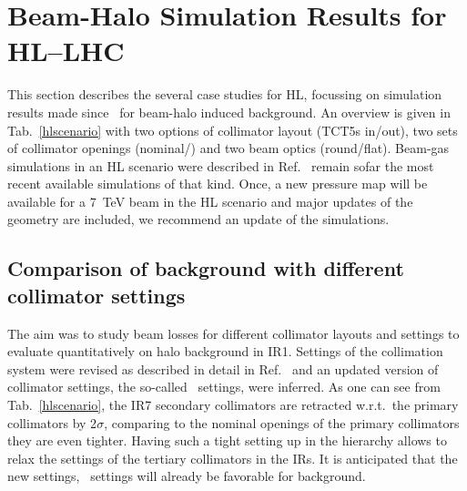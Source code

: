\section{Beam-Halo Simulation Results for HL--LHC\label{hllhcResults}}


This section describes the several case studies for HL, focussing on simulation results made since~\cite{ipac2014_rkh} for beam-halo induced background. An overview is given in Tab.~\ref{hlscenario} with two options of collimator layout (TCT5s in/out), two sets of collimator openings (nominal/\twosigmaret) and two beam optics (round/flat). Beam-gas simulations in an HL scenario were described in Ref.~\cite{ipac2014_rkh} remain sofar the most recent available simulations of that kind. Once, a new pressure map will be available for a 7~TeV beam in the HL scenario and major updates of the geometry are included, we recommend an update of the simulations. 

\subsection{Comparison of background with different collimator settings}

The aim was to study beam losses for different collimator layouts and settings to evaluate quantitatively on halo background in IR1. Settings of the collimation system were revised as described in detail in Ref.~\cite{collSettRef} and an updated version of collimator settings, the so-called \twosigmaret~settings, were inferred. As one can see from Tab.~\ref{hlscenario}, the IR7 secondary collimators are retracted w.r.t.~the primary collimators by 2$\sigma$, comparing to the nominal openings of the primary collimators they are even tighter. Having such a tight setting up in the hierarchy allows to relax the settings of the tertiary collimators in the IRs. It is anticipated that the new settings, \twosigmaret~settings will already be favorable for background.

